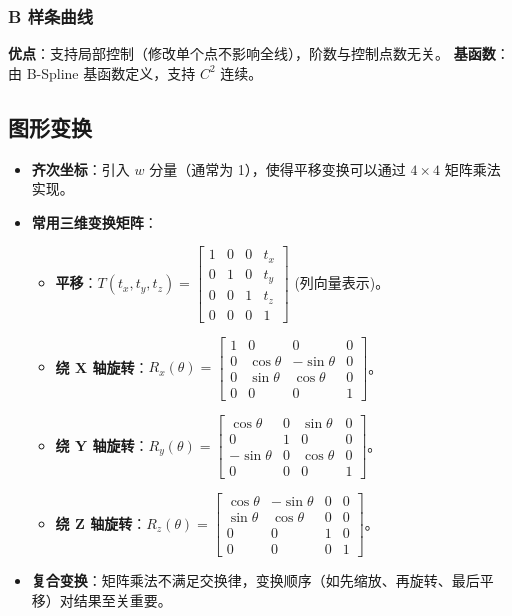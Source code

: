 \documentclass[UTF8]{ctexart}
\begin{document}
\subsubsection{B 样条曲线}
\textbf{优点}：支持局部控制（修改单个点不影响全线），阶数与控制点数无关。
\textbf{基函数}：由 B-Spline 基函数定义，支持 $C^2$ 连续。

\subsection{图形变换}
\begin{itemize}
    \item \textbf{齐次坐标}：引入 $w$ 分量（通常为 1），使得平移变换可以通过 $4\times4$ 矩阵乘法实现。
    \item \textbf{常用三维变换矩阵}：
    \begin{itemize}
        \item \textbf{平移}：$T(t_x, t_y, t_z) = \begin{bmatrix} 1&0&0&t_x \\ 0&1&0&t_y \\ 0&0&1&t_z \\ 0&0&0&1 \end{bmatrix}$ (列向量表示)。
        \item \textbf{绕 X 轴旋转}：$R_x(\theta) = \begin{bmatrix} 1&0&0&0 \\ 0&\cos\theta&-\sin\theta&0 \\ 0&\sin\theta&\cos\theta&0 \\ 0&0&0&1 \end{bmatrix}$。
        \item \textbf{绕 Y 轴旋转}：$R_y(\theta) = \begin{bmatrix} \cos\theta&0&\sin\theta&0 \\ 0&1&0&0 \\ -\sin\theta&0&\cos\theta&0 \\ 0&0&0&1 \end{bmatrix}$。
        \item \textbf{绕 Z 轴旋转}：$R_z(\theta) = \begin{bmatrix} \cos\theta&-\sin\theta&0&0 \\ \sin\theta&\cos\theta&0&0 \\ 0&0&1&0 \\ 0&0&0&1 \end{bmatrix}$。
    \end{itemize}
    \item \textbf{复合变换}：矩阵乘法不满足交换律，变换顺序（如先缩放、再旋转、最后平移）对结果至关重要。
\end{itemize}
\end{document}
